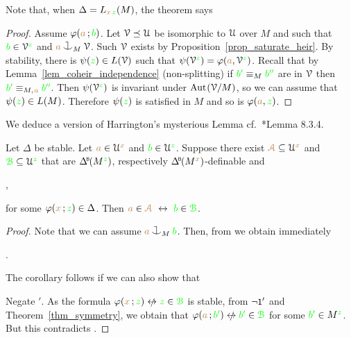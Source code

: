 Note that, when $\Delta= L_{{\color{brown} x}\,{\color{green} z}}(M)$, the theorem says



\vspace*{-\parskip}
\begin{proof}
  Assume $\varphi({\color{brown} a}\,;{\color{green} b})$.
  Let $\EuScript V\preceq\EuScript U$ be isomorphic to $\EuScript U$ over $M$ and such that ${\color{green} b}\in\EuScript V^{\color{green} z}$ and ${\mr a}\cnonfork_M\V$. Such $\EuScript V$ exists by Proposition~\ref{prop_saturate_heir}.
  By stability, there is $\psi({\color{green} z})\in L(\EuScript V)$ such that $\psi(\EuScript V^{\color{green} z})=\varphi({\color{brown} a},\EuScript V^{\color{green} z})$.
  Recall that by Lemma~\ref{lem_coheir_independence} (non-splitting) if ${\color{green} b'}\equiv_M{\color{green} b''}$ are in $\EuScript V$ then ${\color{green} b'}\equiv_{M,\kern.2ex{\color{brown} a}}{\color{green} b''}$.
  Then $\psi(\EuScript V^{\color{green} z})$ is invariant under ${\rm Aut\kern.15ex}(\EuScript V/M)$, so we can assume that $\psi({\color{green} z})\in L(M)$.
  Therefore $\psi({\color{green} z})$ is satisfied in $M$ and so is $\varphi({\color{brown} a},{\color{green} z})$.
\end{proof}

We deduce a version of Harrington's mysterious Lemma cf.~\cite{TZ}*{Lemma 8.3.4}.


\begin{corollary}\label{corol_harrington0}
  Let $\Delta$ be stable.
  Let ${\color{brown} a}\in\EuScript U^{\color{brown} x}$ and ${\color{green} b}\in\EuScript U^{\color{green} z}$. 
  Suppose there exist ${\color{brown}\EuScript A}\subseteq\EuScript U^{\color{brown} x}$ and ${\color{green}\EuScript B}\subseteq\EuScript U^{\color{green} z}$ that are $\BDelta(M^{\gr z})$, respectively $\BDelta(M^{\mr x})$-definable and \smallskip

  \smallskip

  ,\smallskip

  for some $\varphi({\color{brown} x}\,;{\color{green} z})\in\Delta$.
  Then ${\mr a}\in\mrA\ \iff\ {\gr b}\in\grB$.
\end{corollary}

\begin{proof}
  Note that we can assume ${\mr a}\cnonfork_M{\gr b}$.
  Then, from  we obtain immediately

  .

  The corollary follows if we can also show that


  Negate $'$.
  As the formula $\phi({\mr x}\,;{\gr z})\niff{\gr z}\in\grB$ is stable, from $\neg\textsf{\small 1}'$ and Theorem~\ref{thm_symmetry}, we obtain that $\phi({\mr a}\,;{\gr b'})\niff{\gr b'}\in\grB$ for some ${\color{green} b'}\in M^{\color{green} z}$.
  But this contradicts .
\end{proof}

